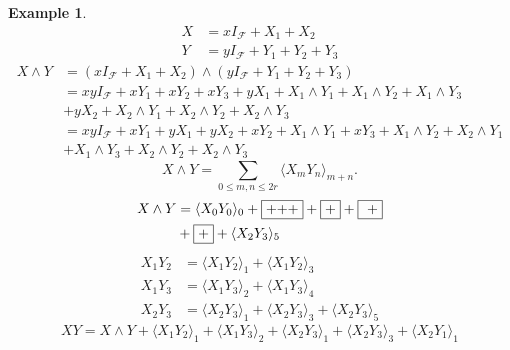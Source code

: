 \documentclass[aps, preprint]{revtex4}
\newtheorem{example}[theorem]{Example}
\begin{document}
\begin{example}
\begin{align}X &  =x I_{\mathcal{F}} +X_{1} +X_{2} \\
Y &  =y I_{\mathcal{F}} +Y_{1} +Y_{2} +Y_{3}\end{align}
\begin{align}X \wedge Y &  =\left (x I_{\mathcal{F}} +X_{1} +X_{2}\right ) \wedge \left (y I_{\mathcal{F}} +Y_{1} +Y_{2} +Y_{3}\right ) \\
 &  =x y I_{\mathcal{F}} +x Y_{1} +x Y_{2} +x Y_{3} +y X_{1} +X_{1} \wedge Y_{1} +X_{1} \wedge Y_{2} +X_{1} \wedge Y_{3} \\
 &  +y X_{2} +X_{2} \wedge Y_{1} +X_{2} \wedge Y_{2} +X_{2} \wedge Y_{3} \\
 &  =x y I_{\mathcal{F}} +x Y_{1} +y X_{1} +y X_{2} +x Y_{2} +X_{1} \wedge Y_{1} +x Y_{3} +X_{1} \wedge Y_{2} +X_{2} \wedge Y_{1} \\
 &  +X_{1} \wedge Y_{3} +X_{2} \wedge Y_{2} +X_{2} \wedge Y_{3}\end{align}
\begin{equation}X \wedge Y =\sum _{0 \leq m ,n \leq 2 r} \langle X_{m} Y_{n} \rangle _{m +n}\text{.}
\end{equation}
\begin{align}X \wedge Y &  = \langle X_{0} Y_{0} \rangle _{0} +\fbox{+++} +\fbox{+} +\fbox{
+} \\
 &  +\fbox{+} + \langle X_{2} Y_{3} \rangle _{5}\end{align}
\begin{align}X_{1} Y_{2} &  = \langle X_{1} Y_{2} \rangle _{1} + \langle X_{1} Y_{2} \rangle _{3} \\
X_{1} Y_{3} &  = \langle X_{1} Y_{3} \rangle _{2} + \langle X_{1} Y_{3} \rangle _{4} \\
X_{2} Y_{3} &  = \langle X_{2} Y_{3} \rangle _{1} + \langle X_{2} Y_{3} \rangle _{3} + \langle X_{2} Y_{3} \rangle _{5}\end{align}
\begin{equation}X Y =X \wedge Y + \langle X_{1} Y_{2} \rangle _{1} + \langle X_{1} Y_{3} \rangle _{2} + \langle X_{2} Y_{3} \rangle _{1} + \langle X_{2} Y_{3} \rangle _{3} + \langle X_{2} Y_{1} \rangle _{1}
\end{equation}
\end{example}
\end{document}
